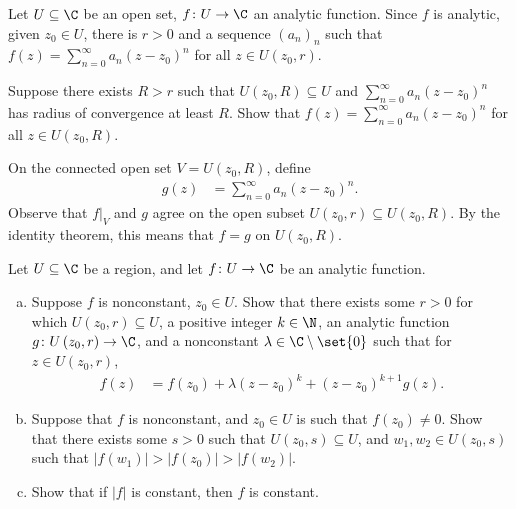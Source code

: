 \documentclass[10pt]{mypackage}
\begin{document}
\begin{problem}[Problem 2]
  Let $U\subseteq \C$ be an open set, $f\colon U\rightarrow \C$ an analytic function. Since $f$ is analytic, given $z_0\in U$, there is $r > 0$ and a sequence $\left( a_n \right)_n$ such that $f(z) = \sum_{n=0}^{\infty}a_n\left( z-z_0 \right)^{n}$ for all $z\in U\left( z_0,r \right)$.\newline

  Suppose there exists $R > r$ such that $U\left( z_0,R \right) \subseteq U$ and $\sum_{n=0}^{\infty}a_n\left( z-z_0 \right)^{n}$ has radius of convergence at least $R$. Show that $f(z) = \sum_{n=0}^{\infty}a_n\left( z-z_0 \right)^{n}$ for all $z\in U\left( z_0,R \right)$.
\end{problem}
\begin{solution}
  On the connected open set $V = U\left( z_0,R \right)$, define
  \begin{align*}
    g(z) &= \sum_{n=0}^{\infty}a_n\left( z-z_0 \right)^{n}.
  \end{align*}
  Observe that $f|_{V}$ and $g$ agree on the open subset $U\left( z_0,r \right)\subseteq U\left( z_0,R \right)$. By the identity theorem, this means that $f = g$ on $U\left( z_0,R \right)$.
\end{solution}
\begin{problem}[Problem 3]
  Let $U\subseteq \C$ be a region, and let $f\colon U\rightarrow \C$ be an analytic function.
  \begin{enumerate}[(a)]
    \item Suppose $f$ is nonconstant, $z_0\in U$. Show that there exists some $r > 0$ for which $U\left( z_0,r \right)\subseteq U$, a positive integer $k\in \N$, an analytic function $g\colon U\left( z_0,r \right)\rightarrow \C$, and a nonconstant $\lambda\in \C\setminus \set{0}$ such that for $z\in U\left( z_0,r \right)$,
      \begin{align*}
        f(z) &= f\left(z_0\right) + \lambda\left( z-z_0 \right)^{k} + \left( z-z_0 \right)^{k+1} g(z).
      \end{align*}
    \item Suppose that $f$ is nonconstant, and $z_0\in U$ is such that $f\left( z_0 \right) \neq 0$. Show that there exists some $s > 0$ such that $U\left( z_0,s \right)\subseteq U$, and $w_1,w_2\in U\left( z_0,s \right)$ such that $\left\vert f\left( w_1 \right) \right\vert > \left\vert f\left( z_0 \right) \right\vert > \left\vert f\left( w_2 \right) \right\vert$.
    \item Show that if $\left\vert f \right\vert$ is constant, then $f$ is constant.
  \end{enumerate}
\end{problem}
\end{document}
